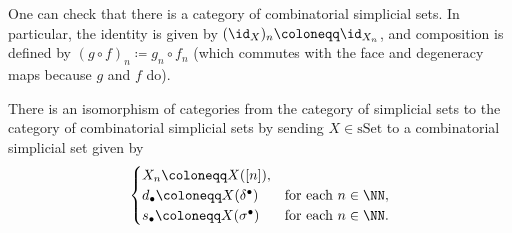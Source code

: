 \documentclass[../notes.tex]{subfiles}
\begin{document}
\begin{remark}
	One can check that there is a category of combinatorial simplicial sets. In particular, the identity is given by $({\id_X})_n\coloneqq\id_{X_n}$, and composition is defined by $(g\circ f)_n\coloneqq g_n\circ f_n$ (which commutes with the face and degeneracy maps because $g$ and $f$ do).
\end{remark}
\begin{proposition} \label{prop:sset-by-combo}
	There is an isomorphism of categories from the category of simplicial sets to the category of combinatorial simplicial sets by sending $X\in\mathrm{sSet}$ to a combinatorial simplicial set given by
	\[\begin{cases}
		X_n\coloneqq X([n]), \\
		d_\bullet\coloneqq X(\delta^\bullet) & \text{for each }n\in\NN, \\
		s_\bullet\coloneqq X(\sigma^\bullet) & \text{for each }n\in\NN.
	\end{cases}\]
\end{proposition}
\end{document}
